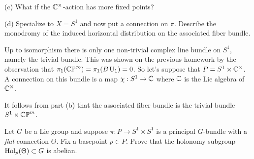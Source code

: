 \documentclass{../../templates/lkx_pset}
\begin{document}
\begin{parts}
  \begin{part}{(c)}
    What if the $\mathbb{C}^\times$-action has more fixed points?
  \end{part}

  \begin{part}{(d)}
    Specialize to $X = S^1$ and now put a connection on $\pi$. Describe the monodromy of the induced horizontal distribution on the associated fiber bundle.
  \end{part}

  Up to isomorphism there is only one non-trivial complex line bundle on $S^1$, namely the trivial bundle. This was shown on the previous homework by the observation that $\pi_1(\mathbb{CP}^\infty) = \pi_1(B\operatorname{U}_1) = 0$. So let's suppose that $P = S^1\times \mathbb{C}^\times$. A connection on this bundle is a map $\chi : S^1 \to \mathbb{C}$ where $\mathbb{C}$ is the Lie algebra of $\mathbb{C}^\times$.

  It follows from part (b) that the associated fiber bundle is the trivial bundle $S^1\times \mathbb{CP}^m$.
\end{parts}

\begin{problem}{7}
  Let $G$ be a Lie group and suppose $\pi : P \to S^1\times S^1$ is a principal $G$-bundle with a \emph{flat} connection $\Theta$. Fix a basepoint $p\in P$. Prove that the holonomy subgroup $\operatorname{Hol}_p(\Theta)\subset G$ is abelian.
\end{problem}
\end{document}
